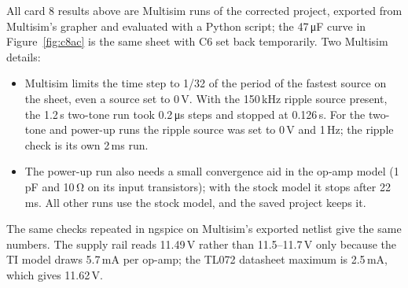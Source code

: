 \documentclass[11pt]{article}
\begin{document}
All card 8 results above are Multisim runs of the corrected project, exported from Multisim's grapher and
evaluated with a Python script; the 47\,\si{\micro\farad} curve in
Figure~\ref{fig:c8ac} is the same sheet with C6 set back temporarily. Two Multisim details:
\begin{itemize}
  \item Multisim limits the time step to 1/32 of the period of the fastest source on the sheet, even a source set
        to 0\,V. With the 150\,kHz ripple source present, the 1.2\,s two-tone run took 0.2\,\si{\micro\second} steps
        and stopped at 0.126\,s. For the two-tone and power-up runs the ripple source was set to 0\,V and 1\,Hz;
        the ripple check is its own 2\,ms run.
  \item The power-up run also needs a small convergence aid in the op-amp model (1\,pF and 10\,\si{\ohm} on its
        input transistors); with the stock model it stops after 22\,ms. All other runs use the stock model, and
        the saved project keeps it.
\end{itemize}
The same checks repeated in ngspice on Multisim's exported netlist give the same numbers. The supply rail reads 11.49\,V rather than 11.5--11.7\,V only
because the TI model draws 5.7\,mA per op-amp; the TL072 datasheet maximum is 2.5\,mA, which gives 11.62\,V.
\end{document}
